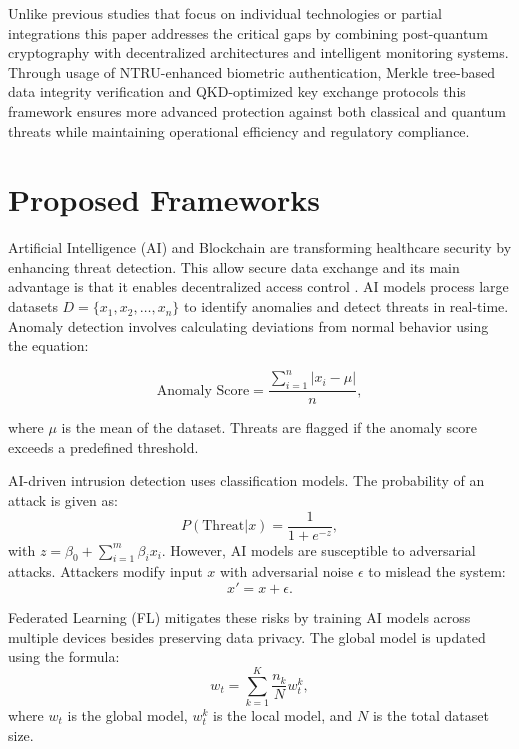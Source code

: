 \documentclass[pdflatex,sn-mathphys-num]{sn-jnl}%
\theoremstyle{thmstyleone}%
\theoremstyle{thmstyletwo}%
\theoremstyle{thmstylethree}%
\begin{document}
 Unlike previous studies that focus on individual technologies or partial integrations this paper addresses the critical gaps by combining post-quantum cryptography with decentralized architectures and intelligent monitoring systems. Through usage of NTRU-enhanced biometric authentication, Merkle tree-based data integrity verification and QKD-optimized key exchange protocols this framework ensures more advanced protection against both classical and quantum threats while maintaining operational efficiency and regulatory compliance.


\section{Proposed Frameworks}
Artificial Intelligence (AI) and Blockchain are transforming healthcare security \cite{bib6} by enhancing threat detection. This allow secure data exchange and its main advantage is that it enables  decentralized access control . AI models process large datasets \(D = \{x_1, x_2, \ldots, x_n\}\) to identify anomalies and detect threats in real-time. Anomaly detection involves calculating deviations from normal behavior using the equation:


\begin{equation}
\text{Anomaly Score} = \frac{\sum_{i=1}^n |x_i - \mu|}{n}, 
\end{equation}


where \(\mu\) is the mean of the dataset. Threats are flagged if the anomaly score exceeds a predefined threshold.

AI-driven intrusion detection uses classification models. The probability of an attack is given as:
\begin{equation}
P(\text{Threat} | x) = \frac{1}{1 + e^{-z}}, 
\end{equation}
with \(z = \beta_0 + \sum_{i=1}^m \beta_i x_i\). However, AI models are susceptible to adversarial attacks. Attackers modify input \(x\) with adversarial noise \(\epsilon\) to mislead the system:
\begin{equation}
x' = x + \epsilon.
\end{equation}

Federated Learning (FL) mitigates these risks by training AI models across multiple devices besides preserving data privacy\cite{bib9}. The global model is updated using the formula:
\begin{equation}
w_t = \sum_{k=1}^K \frac{n_k}{N} w_t^k, 
\end{equation}
where \(w_t\) is the global model, \(w_t^k\) is the local model, and \(N\) is the total dataset size.
\end{document}
